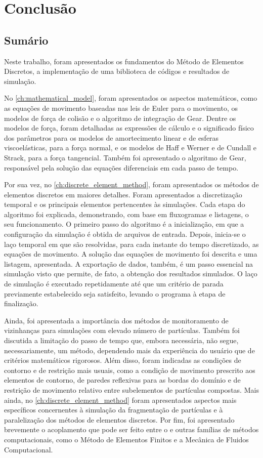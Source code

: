 \chapter{Conclusão} \label{ch:conclusion}

\section{Sumário}

Neste trabalho, foram apresentados os fundamentos do Método de Elementos Discretos, a implementação de uma biblioteca de códigos e resultados de simulação.

No \cref{ch:mathematical_model}, foram apresentados os aspectos matemáticos, como as equações de movimento baseadas nas leis de Euler para o movimento, os modelos de força de colisão e o algoritmo de integração de Gear. Dentre os modelos de força, foram detalhadas as expressões de cálculo e o significado físico dos parâmetros para os modelos de amortecimento linear e de esferas viscoelásticas, para a força normal, e os modelos de Haff e Werner e de Cundall e Strack, para a força tangencial. Também foi apresentado o algoritmo de Gear, responsável pela solução das equações diferenciais em cada passo de tempo.

Por sua vez, no \cref{ch:discrete_element_method}, foram apresentados os métodos de elementos discretos em maiores detalhes. Foram apresentados a discretização temporal e os principais elementos pertencentes às simulações. Cada etapa do algoritmo foi explicada, demonstrando, com base em fluxogramas e listagens, o seu funcionamento. O primeiro passo do algoritmo é a inicialização, em que a configuração da simulação é obtida de arquivos de entrada. Depois, inicia-se o laço temporal em que são resolvidas, para cada instante do tempo discretizado, as equações de movimento. A solução das equações de movimento foi descrita e uma listagem, apresentada. A exportação de dados, também, é um passo essencial na simulação visto que permite, de fato, a obtenção dos resultados simulados. O laço de simulação é executado repetidamente até que um critério de parada previamente estabelecido seja satisfeito, levando o programa à etapa de finalização. 

Ainda, foi apresentada a importância dos métodos de monitoramento de vizinhanças para simulações com elevado número de partículas. Também foi discutida a limitação do passo de tempo que, embora necessária, não segue, necessariamente, um método, dependendo mais da experiência do usuário que de critérios matemáticos rigorosos. Além disso, foram indicadas as condições de contorno e de restrição mais usuais, como a condição de movimento prescrito aos elementos de contorno, de paredes reflexivas para as bordas do domínio e de restrição de movimento relativo entre subelementos de partículas compostas. Mais ainda, no \cref{ch:discrete_element_method} foram apresentados aspectos mais específicos concernentes à simulação da fragmentação de partículas e à paralelização dos métodos de elementos discretos. Por fim, foi apresentado brevemente o acoplamento que pode ser feito entre o \DEM{} e outras famílias de métodos computacionais, como o Método de Elementos Finitos e a Mecânica de Fluidos Computacional.

